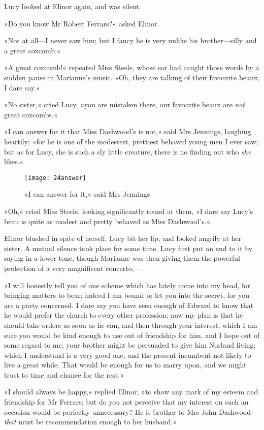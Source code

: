 Lucy looked at Elinor again, and was silent.

»Do you know Mr Robert Ferrars?« asked Elinor.

»Not at all—I never saw him; but I fancy he is very unlike his brother—silly and a great coxcomb.«

»A great coxcomb!« repeated Miss Steele, whose ear had caught those words by a sudden pause in Marianne’s music. »Oh, they are talking of their favourite beaux, I dare say.«

»No sister,« cried Lucy, »you are mistaken there, our favourite beaux are \textit{not} great coxcombs.«

»I can answer for it that Miss Dashwood’s is not,« said Mrs Jennings, laughing heartily; »for he is one of the modestest, prettiest behaved young men I ever saw; but as for Lucy, she is such a sly little creature, there is no finding out who \textit{she} likes.«

\begin{figure}[tbph]
\centering
\texttt{[image: 24answer]}
\caption{»I can answer for it,« said Mrs Jennings}
\end{figure}

»Oh,« cried Miss Steele, looking significantly round at them, »I dare say Lucy’s beau is quite as modest and pretty behaved as Miss Dashwood’s.«

Elinor blushed in spite of herself. Lucy bit her lip, and looked angrily at her sister. A mutual silence took place for some time. Lucy first put an end to it by saying in a lower tone, though Marianne was then giving them the powerful protection of a very magnificent concerto,—

»I will honestly tell you of one scheme which has lately come into my head, for bringing matters to bear; indeed I am bound to let you into the secret, for you are a party concerned. I dare say you have seen enough of Edward to know that he would prefer the church to every other profession; now my plan is that he should take orders as soon as he can, and then through your interest, which I am sure you would be kind enough to use out of friendship for him, and I hope out of some regard to me, your brother might be persuaded to give him Norland living; which I understand is a very good one, and the present incumbent not likely to live a great while. That would be enough for us to marry upon, and we might trust to time and chance for the rest.«

»I should always be happy,« replied Elinor, »to show any mark of my esteem and friendship for Mr Ferrars; but do you not perceive that my interest on such an occasion would be perfectly unnecessary? He is brother to Mrs John Dashwood—\textit{that} must be recommendation enough to her husband.«


